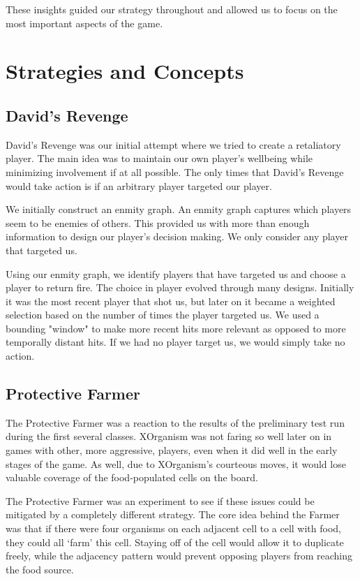 \documentclass[
10pt, %
letterpaper, %
oneside, %
headinclude,footinclude, %
english
]{article}
\begin{document}
These insights guided our strategy throughout and allowed us to focus on the most important aspects of the game.

\section{Strategies and Concepts}

\subsection{David's Revenge}

David's Revenge was our initial attempt where we tried to create a retaliatory player. The main idea was to maintain our own player's wellbeing while minimizing involvement if at all possible. The only times that David's Revenge would take action is if an arbitrary player targeted our player. 

We initially construct an enmity graph. An enmity graph captures which players seem to be enemies of others. This provided us with more than enough information to design our player's decision making. We only consider any player that targeted us.

Using our enmity graph, we identify players that have targeted us and choose a player to return fire. The choice in player evolved through many designs. Initially it was the most recent player that shot us, but later on it became a weighted selection based on the number of times the player targeted us. We used a bounding "window" to make more recent hits more relevant as opposed to more temporally distant hits. If we had no player target us, we would simply take no action.


\subsection{Protective Farmer}
The Protective Farmer was a reaction to the results of the preliminary test run during the first several classes. XOrganism was not faring so well later on in games with other, more aggressive, players, even when it did well in the early stages of the game. As well, due to XOrganism's courteous moves, it would lose valuable coverage of the food-populated cells on the board.

The Protective Farmer was an experiment to see if these issues could be mitigated by a completely different strategy. The core idea behind the Farmer was that if there were four organisms on each adjacent cell to a cell with food, they could all `farm' this cell. Staying off of the cell would allow it to duplicate freely, while the adjacency pattern would prevent opposing players from reaching the food source.
\end{document}
